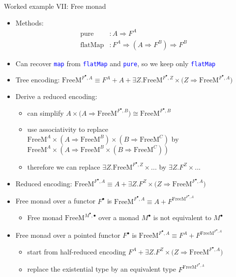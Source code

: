 \documentclass[english,,russian]{beamer}
\begin{document}
\begin{frame}{Worked example VII: Free monad}
\begin{itemize}
\item {\footnotesize{}\vspace{-0.25cm}}Methods:{\footnotesize{}\vspace{-0.25cm}}
\begin{align*}
\text{pure} & :A\Rightarrow F^{A}\\
\text{flatMap} & :F^{A}\Rightarrow(A\Rightarrow F^{B})\Rightarrow F^{B}
\end{align*}
\item {\footnotesize{}\vspace{-0.3cm}}Can recover \texttt{\textcolor{blue}{\footnotesize{}map}}
from \texttt{\textcolor{blue}{\footnotesize{}flatMap}} and \texttt{\textcolor{blue}{\footnotesize{}pure}},
so we keep only \texttt{\textcolor{blue}{\footnotesize{}flatMap}} 
\item Tree encoding: {\footnotesize{}$\text{FreeM}^{F^{\bullet},A}\equiv F^{A}+A+\exists Z.\text{FreeM}^{F^{\bullet},Z}\times\big(Z\Rightarrow\text{FreeM}^{F^{\bullet},A}\big)$}{\footnotesize\par}
\item Derive a reduced encoding: 
\begin{itemize}
\item can simplify $A\times\big(A\Rightarrow\text{FreeM}^{F^{\bullet},B}\big)\cong\text{FreeM}^{F^{\bullet},B}$
\item use associativity to replace $\text{FreeM}^{A}\times(A\Rightarrow\text{FreeM}^{B})\times(B\Rightarrow\text{FreeM}^{C})$
by $\text{FreeM}^{A}\times\left(A\Rightarrow\text{FreeM}^{B}\times(B\Rightarrow\text{FreeM}^{C})\right)$
\item therefore we can replace $\exists Z.\text{FreeM}^{F^{\bullet},Z}\times...$
by $\exists Z.F^{Z}\times...$
\end{itemize}
\item Reduced encoding: $\text{FreeM}^{F^{\bullet},A}\equiv A+\exists Z.F^{Z}\times\big(Z\Rightarrow\text{FreeM}^{F^{\bullet},A}\big)$
\item Free monad over a functor $F^{\bullet}$ is $\text{FreeM}^{F^{\bullet},A}\equiv A+F^{\text{FreeM}^{F^{\bullet},A}}$
\begin{itemize}
\item Free monad $\text{FreeM}^{M^{\bullet},\bullet}$ over a monad $M^{\bullet}$
is not equivalent to $M^{\bullet}$
\end{itemize}
\item Free monad over a pointed functor $F^{\bullet}$ is {\footnotesize{}$\text{FreeM}^{F^{\bullet},A}\equiv F^{A}+F^{\text{FreeM}^{F^{\bullet},A}}$}{\footnotesize\par}
\begin{itemize}
\item start from half-reduced encoding $F^{A}+\exists Z.F^{Z}\times\big(Z\Rightarrow\text{FreeM}^{F^{\bullet},A}\big)$ 
\item replace the existential type by an equivalent type $F^{\text{FreeM}^{F^{\bullet},A}}$
\end{itemize}
\end{itemize}
\end{frame}
\end{document}
